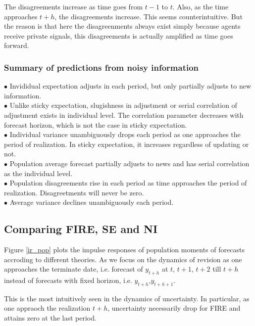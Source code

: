 \documentclass[]{article}
\begin{document}
The disagreements increase as time goes from $t-1$ to $t$. Also, as the time approaches $t+h$, the disagreements increase. This seems counterintuitive. But the reason is that here the disagreenments always exist simply because agents receive private signals, this disagreements is actually amplified as time goes forward. 


\subsubsection{Summary of predictions from noisy information}

$\bullet$  Invididual expectation adjusts in each period, but only partially adjusts to new information. \\
$\bullet$ Unlike sticky expectation, slugishness in adjustment or serial correlation of adjustment exists in individual level. The correlation parameter decreases with forecast horizon, which is not the case in sticky expectation.\\
$\bullet$  Individual variance unambiguously drops each period as one approaches the period of realization. In sticky expectation, it increases regardless of updating or not. \\ 
$\bullet$  Population average forecast partially adjusts to news and has serial correlation as the individual level. \\
$\bullet$  Population disagreements rise in each period as time approaches the period of realization. Disagreetments will never be zero. \\
$\bullet$  Average variance declines unambiguously each period. 

\subsection{Comparing FIRE, SE and NI}

Figure \ref{ir_pop} plots the impulse responses of population moments of forecasts accroding to different theories. As we focus on the dynamics of revision as one approaches the terminate date, i.e. forecast of $y_{t+h}$ at $t$, $t+1$, $t+2$ till $t+h$ instead of forecasts with fixed horizon, i.e. $y_{t+h}$,$y_{t+h+1}$. 

This is the most intuitively seen in the dynamics of uncertainty. In particular, as one appraoch the realization $t+h$, uncertainty necessarily drop for FIRE and attains zero at the last period.  
\end{document}
